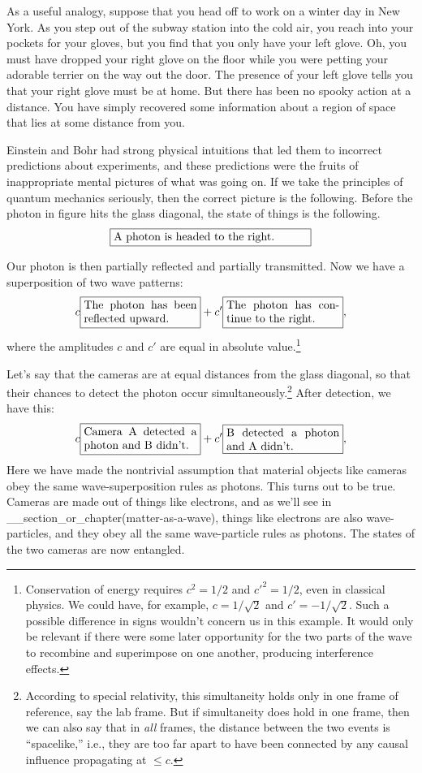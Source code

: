 As a useful analogy, suppose that you head off to work on a winter day
in New York. As you step out of the subway station into the cold air,
you reach into your pockets for your gloves, but you find that
you only have your left glove. Oh, you must have dropped your right
glove on the floor while you were petting your adorable terrier on the way out the
door. The presence of your left glove tells you that your right glove
must be at home. But there has been no
spooky action at a distance. You have simply recovered some
information about a region of space that lies at some distance from
you.

Einstein and Bohr had strong physical intuitions that led them to
incorrect predictions about experiments, and these predictions were
the fruits of inappropriate mental pictures of what was going on. If we take
the principles of quantum mechanics seriously, then the correct picture
is the following. Before the photon in figure  hits the glass
diagonal, the state of things is the following.
\begin{equation*}
\fbox{\parbox{60mm}{A photon is headed to the right.}}
\end{equation*}

Our photon is then partially reflected and partially transmitted. Now we have
a superposition of two wave patterns:
\begin{equation*}
 c\fbox{\parbox{35mm}{The photon has been reflected upward.}}
+c'\fbox{\parbox{35mm}{The photon has continue to the right.}},
\end{equation*}
where the amplitudes $c$ and $c'$ are equal in absolute value.\footnote{
Conservation of energy requires $c^2=1/2$ and $c'^2=1/2$,
even in classical physics. We could have, for
example, $c=1/\sqrt{2}$ and $c'=-1/\sqrt{2}$. Such a possible difference in
signs wouldn't concern us in this example. It would only be relevant if there
were some later opportunity for the two parts of the wave to recombine and
superimpose on one another, producing interference effects.}

Let's say that the cameras are at equal distances from the glass diagonal,
so that their chances to detect the photon occur simultaneously.\footnote{
According to special relativity, this simultaneity holds only in one frame
of reference, say the lab frame. But if simultaneity does hold in one frame,
then we can also say that in \emph{all} frames, the distance between the two
events is ``spacelike,'' i.e., they are too far apart to have been connected
by any causal influence propagating at $\le c$.
}
After detection, we have this:
\begin{equation*}
 c\fbox{\parbox{35mm}{Camera A detected a photon and B didn't.}}
+c'\fbox{\parbox{35mm}{B detected a photon and A didn't.}},
\end{equation*}
Here we have made the nontrivial assumption that material objects like
cameras obey the same wave-superposition rules as photons. This turns out
to be true. Cameras are made out of things like electrons,
and as we'll see in __section_or_chapter(matter-as-a-wave), things like
electrons are also wave-particles, and they obey all the same wave-particle rules
as photons. The states of the two cameras are now entangled.

